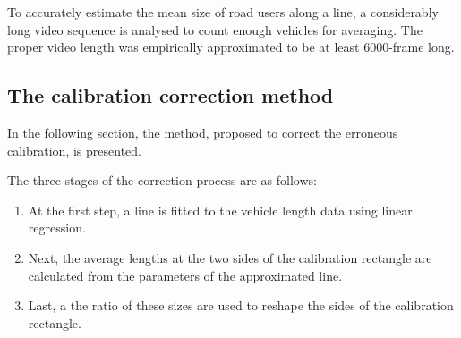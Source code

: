 To accurately estimate the mean size of road users along a line, a considerably long video sequence is analysed to count enough vehicles for averaging.
The proper video length was empirically approximated to be at least 6000-frame long.

\subsection{The calibration correction method}\label{sec:calibration_correction_method}
In the following section, the method, proposed to correct the erroneous calibration, is presented.

The three stages of the correction process are as follows:
\begin{enumerate}
\item At the first step, a line is fitted to the vehicle length data using linear regression.
\item Next, the average lengths at the two sides of the calibration rectangle are calculated from the parameters of the approximated line.
\item Last, a the ratio of these sizes are used to reshape the sides of the calibration rectangle.
\end{enumerate}

